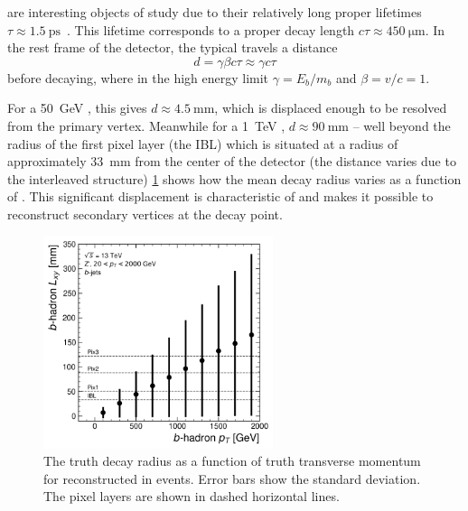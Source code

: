 \bhadrons are interesting objects of study due to their relatively long proper lifetimes $\tau \approx \SI{1.5}{\pico\second}$~\cite{PhysRevD.98.030001}.
This lifetime corresponds to a proper decay length $c \tau \approx \SI{450}{\micro\meter}$.
In the rest frame of the detector, the typical \bhadron travels a distance 
%
\begin{equation}
  d = \gamma \beta c \tau \approx \gamma c \tau
\end{equation}
%
before decaying, where in the high energy limit $\gamma = E_b/m_b$ and $\beta = v/c = 1$.

For a \SI{50}{\GeV} \bhadron, this gives $d \approx \SI{4.5}{\milli\meter}$, which is displaced enough to be resolved from the primary vertex.
Meanwhile for a \SI{1}{\TeV} \bhadron, $d \approx \SI{90}{\milli\meter}$ -- well beyond the radius of the first pixel layer (the IBL) which is situated at a radius of approximately \SI{33}{\milli\meter} from the center of the detector (the distance varies due to the interleaved structure) 
\cref{fig:b_lxy_vs_pt} shows how the mean decay radius varies as a function of \bhadron \pt.
This significant displacement is characteristic of \bjets and makes it possible to reconstruct secondary vertices at the \bhadron decay point.

\begin{figure}[!htbp]
  \centering
  \includegraphics[width=0.6\textwidth]{chapters/3.tracking/figs/b_pt_lxy.pdf}
  \caption{
    The truth \bhadron decay radius \Lxy as a function of truth transverse momentum \pt for reconstructed \bjets in \Zprime events.
    Error bars show the standard deviation.
    The pixel layers are shown in dashed horizontal lines.
  }
  \label{fig:b_lxy_vs_pt}
\end{figure}

